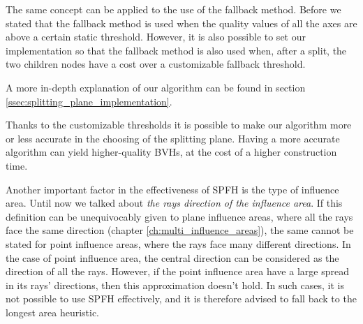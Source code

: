 \documentclass{PoliMi_MasterThesis}
\begin{document}
The same concept can be applied to the use of the fallback method. Before we stated that the fallback method is used when the quality values of all the axes are above a certain static threshold. However, it is also possible to set our implementation so that the fallback method is also used when, after a split, the two children nodes have a cost over a customizable fallback threshold.

A more in-depth explanation of our algorithm can be found in section \ref{ssec:splitting_plane_implementation}.

Thanks to the customizable thresholds it is possible to make our algorithm more or less accurate in the choosing of the splitting plane. Having a more accurate algorithm can yield higher-quality BVHs, at the cost of a higher construction time.

Another important factor in the effectiveness of SPFH is the type of influence area. Until now we talked about \textit{the rays direction of the influence area}. If this definition can be unequivocably given to plane influence areas, where all the rays face the same direction (chapter \ref{ch:multi_influence_areas}), the same cannot be stated for point influence areas, where the rays face many different directions. In the case of point influence area, the central direction can be considered as the direction of all the rays. However, if the point influence area have a large spread in its rays' directions, then this approximation doesn't hold. In such cases, it is not possible to use SPFH effectively, and it is therefore advised to fall back to the longest area heuristic.
\end{document}
